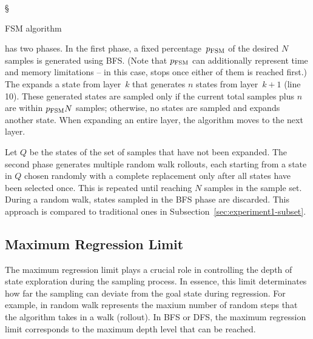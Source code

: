 \begin{algorithm}[ht]
{        

        \Return \S \\
    }

    \caption{FSM algorithm}
    \label{alg:fsm}
\end{algorithm}

\bfs has two phases. In the first phase, a fixed percentage~$p_\text{FSM}$ of the desired $N$ samples is generated using BFS. (Note that $p_\text{FSM}$ can additionally represent time and memory limitations -- in this case, \bfs stops once either of them is reached first.) The \bfs expands a state from layer~$k$ that generates $n$ states from layer~$k+1$ (line 10). These generated states are sampled only if the current total samples plus $n$ are within $p_{\text{FSM}}N$ samples; otherwise, no states are sampled and \bfs expands another state. When expanding an entire layer, the algorithm moves to the next layer.

Let $Q$ be the states of the set of samples that have not been expanded. The second phase generates multiple random walk rollouts, each starting from a state in $Q$ chosen randomly with a complete replacement only after all states have been selected once. This is repeated until reaching $N$ samples in the sample set. During a random walk, states sampled in the BFS phase are discarded. This approach is compared to traditional ones in Subsection~\ref{sec:experiment1-subset}.

\subsection{Maximum Regression Limit}
\label{sec:rollout-depth-limit}

The maximum regression limit plays a crucial role in controlling the depth of state exploration during the sampling process. In essence, this limit determinates how far the sampling can deviate from the goal state during regression. For example, in random walk represents the maxium number of random steps that the algorithm takes in a walk (rollout). In BFS or DFS, the maximum regression limit corresponds to the maximum depth level that can be reached.

